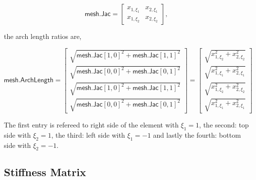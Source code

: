 \documentclass[10pt, a4paper]{article}
\begin{document}
\begin{equation*}
\textsf{mesh.Jac} = \begin{bmatrix}
x_{1,\xi_1} & x_{2,\xi_1} \\
x_{1,\xi_2} & x_{2,\xi_2} 
\end{bmatrix},
\end{equation*}

the arch length ratios are,

\begin{equation*}
\textsf{mesh.ArchLength} = \begin{bmatrix}
\sqrt{\textsf{mesh.Jac}[1,0]^2 + \textsf{mesh.Jac}[1,1]^2} \\[.2cm]
\sqrt{\textsf{mesh.Jac}[0,0]^2 + \textsf{mesh.Jac}[0,1]^2} \\[.2cm]
\sqrt{\textsf{mesh.Jac}[1,0]^2 + \textsf{mesh.Jac}[1,1]^2} \\[.2cm]
\sqrt{\textsf{mesh.Jac}[0,0]^2 + \textsf{mesh.Jac}[0,1]^2}
\end{bmatrix} = \begin{bmatrix}
\sqrt{x_{1,\xi_2}^2 + x_{2,\xi_2}^2} \\[.2cm]
\sqrt{x_{1,\xi_1}^2 + x_{2,\xi_1}^2} \\[.2cm]
\sqrt{x_{1,\xi_2}^2 + x_{2,\xi_2}^2} \\[.2cm]
\sqrt{x_{1,\xi_1}^2 + x_{2,\xi_1}^2} 
\end{bmatrix}
\end{equation*}

The first entry is refereed to right side of the element with $\xi_1=1$, the second: top side with $\xi_2=1$, the third: left side with $\xi_1=-1$ and lastly the fourth: bottom side with $\xi_2=-1$.

\subsection{Stiffness Matrix}
\end{document}
